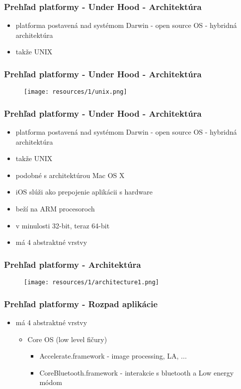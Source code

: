 \documentclass[serif,mathserif]{beamer}
\begin{document}
\begin{frame}
  \frametitle{Prehľad platformy - Under Hood - Architektúra}
  \begin{itemize}
	\item platforma postavená nad systémom Darwin - open source OS - hybridná architektúra\pause
	\item takže UNIX
  \end{itemize}
\end{frame}


\begin{frame}
  \frametitle{Prehľad platformy - Under Hood - Architektúra}
  \begin{figure}[h]
	\texttt{[image: resources/1/unix.png]}
  \end{figure}
\end{frame}

\begin{frame}
  \frametitle{Prehľad platformy - Under Hood - Architektúra}
  \begin{itemize}
	\item platforma postavená nad systémom Darwin - open source OS - hybridná architektúra
	\item takže UNIX
	\item podobné s architektúrou Mac OS X\pause
	\item iOS slúži ako prepojenie aplikácii s hardware\pause
	\item beží na ARM procesoroch\pause
	\item v minulosti 32-bit, teraz 64-bit\pause
	\item má 4 abstraktné vrstvy
  \end{itemize}
\end{frame}

\begin{frame}
  \frametitle{Prehľad platformy - Architektúra}
  \begin{figure}[h]
	\texttt{[image: resources/1/architecture1.png]}
  \end{figure}
\end{frame}

\begin{frame}
  \frametitle{Prehľad platformy - Rozpad aplikácie}
  \begin{itemize}
	\item má 4 abstraktné vrstvy\pause
	\begin{itemize}
	\item Core OS (low level fičury)\pause
	\begin{itemize}
	\item Accelerate.framework - image processing, LA, ...\pause
	\item CoreBluetooth.framework - interakcie s bluetooth a Low energy módom\pause 
  \end{itemize}	
  \end{itemize}
  \end{itemize}
\end{frame}
\end{document}
